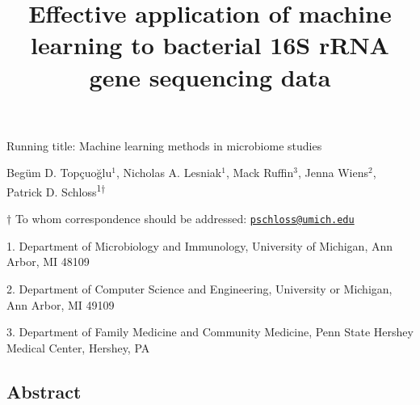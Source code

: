 \documentclass[11pt,]{article}
\title{\textbf{Effective application of machine learning to bacterial 16S rRNA
gene sequencing data}}
\author{}
\date{}
\begin{document}
\maketitle

\vspace{35mm}

Running title: Machine learning methods in microbiome studies

\vspace{35mm}

Begüm D. Topçuoğlu\({^1}\), Nicholas A. Lesniak\({^1}\), Mack
Ruffin\({^3}\), Jenna Wiens\({^2}\), Patrick D.
Schloss\textsuperscript{1\(\dagger\)}

\vspace{40mm}

\(\dagger\) To whom correspondence should be addressed:
\href{mailto:pschloss@umich.edu}{\nolinkurl{pschloss@umich.edu}}

1. Department of Microbiology and Immunology, University of Michigan,
Ann Arbor, MI 48109

2. Department of Computer Science and Engineering, University or
Michigan, Ann Arbor, MI 49109

3. Department of Family Medicine and Community Medicine, Penn State
Hershey Medical Center, Hershey, PA

\newpage

\linenumbers

\subsection{Abstract}\label{abstract}
\end{document}
